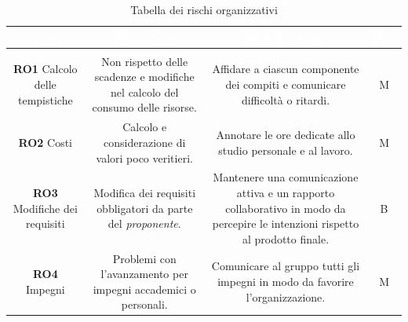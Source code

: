 \begin{center}
\begin{longtable}{C{\colA} | C{\colB} | C{\colC} | C{\colD}}
		\textcolor{white}{\textbf{Codice}} & 
		\textcolor{white}{\textbf{Descrizione}} & 
		\textcolor{white}{\textbf{Identificazione}} & 
		\textcolor{white}{\textbf{Occ.}} \\
		\endfirsthead
	    \\
	    \endfoot
	    \caption{Tabella dei rischi organizzativi}
	    \endlastfoot

\textbf{RO1} \newline Calcolo delle tempistiche &

Non rispetto delle scadenze e modifiche nel calcolo del consumo delle risorse. & 

Affidare a ciascun componente dei compiti e comunicare difficoltà o ritardi.  & 

M \\
\textbf{RO2} \newline Costi &

Calcolo e considerazione di valori poco veritieri.  & 

Annotare le ore dedicate allo studio personale e al lavoro.  & 

M \\

\textbf{RO3} \newline Modifiche dei requisiti &

Modifica dei requisiti obbligatori da parte del \textit{proponente}.  & 

Mantenere una comunicazione attiva e un rapporto collaborativo in modo da percepire le intenzioni rispetto al prodotto finale.  & 

B\\
\textbf{RO4} \newline Impegni &

Problemi con l'avanzamento per impegni accademici o personali.  & 

Comunicare al gruppo tutti gli impegni in modo da favorire l'organizzazione.  & 

M \\

\end{longtable}
\end{center}

